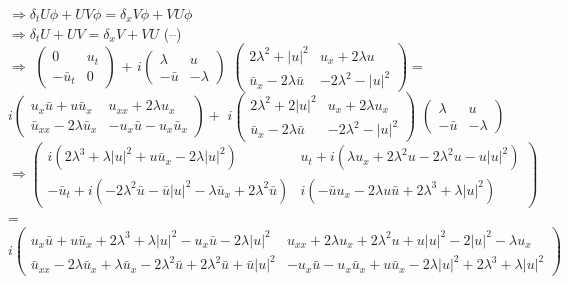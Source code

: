 \documentclass[12pt]{article}
\begin{document}
$\Rightarrow \delta_{t} U \phi + UV \phi = \delta_{x} V \phi + VU \phi$ \\
$\Rightarrow \delta_{t} U + UV = \delta_{x} V + VU$ (--) \\ 
$\Rightarrow$
$\begin{pmatrix} 
	0 & u_{t} \\
	-\bar{u}_{t} & 0
\end{pmatrix}$ +
$i \begin{pmatrix} 
\lambda & u \\
-\bar{u} & -\lambda
\end{pmatrix}$ 
$ \begin{pmatrix} 
2\lambda^{2} + |u|^{2} & u_{x}+2\lambda u \\
\bar{u}_{x} -2\lambda\bar{u} & -2\lambda^{2} - |u|^{2}
\end{pmatrix} =$ 
$ i \begin{pmatrix} 
u_{x}\bar{u} + u\bar{u}_{x} & u_{xx} + 2\lambda u_{x} \\
\bar{u}_{xx} - 2 \lambda \bar{u}_{x} & -u_{x} \bar{u} - u_{x}\bar{u}_{x}
\end{pmatrix} +$ 
$i \begin{pmatrix} 
2 \lambda^{2} + 2|u|^{2} & u_{x} + 2\lambda u_{x} \\
\bar{u}_{x} - 2 \lambda \bar{u} & -2 \lambda^{2} - |u|^{2}
\end{pmatrix}$ 
$\begin{pmatrix} 
	\lambda & u \\
	- \bar{u} & - \lambda
\end{pmatrix}$
\\
$\Rightarrow \begin{pmatrix} 
	i(2 \lambda ^{3} + \lambda |u|^{2} + u\bar{u}_{x} -2\lambda |u|^{2}) & 
	u_{t} + i(\lambda u_{x} + 2 \lambda^{2} u - 2 \lambda^{2} u - u|u|^{2}) \\
	-\bar{u}_{t} + i(-2 \lambda^{2}\bar{u} - \bar{u}|u|^{2} - 
	\lambda\bar{u}_{x} + 2 \lambda^{2} \bar{u}) & i(-\bar{u} u_{x} - 2 \lambda 
	u \bar{u} + 2 \lambda^{3} + \lambda |u|^{2})
\end{pmatrix} $ = \\
$ i \begin{pmatrix} 
	u_{x}\bar{u} + u\bar{u}_{x} + 2 \lambda^{3} + \lambda |u|^{2} - 
	u_{x}\bar{u} - 2\lambda |u|^{2} & u_{xx} + 2\lambda u_{x} + 2\lambda^{2} u 
	+ u|u|^{2} - 2|u|^{2} - \lambda u_{x} \\
	\bar{u}_{xx} - 2\lambda \bar{u}_{x} + \lambda \bar{u}_{x} - 
	2\lambda^{2}\bar{u} + 2\lambda^{2}\bar{u} + \bar{u}|u|^{2} & -u_{x}\bar{u} 
	- u_{x}\bar{u}_{x} + u\bar{u}_{x} - 2\lambda |u|^{2} + 2\lambda^{3} + 
	\lambda |u|^{2}
\end{pmatrix}$ \\
\end{document}
